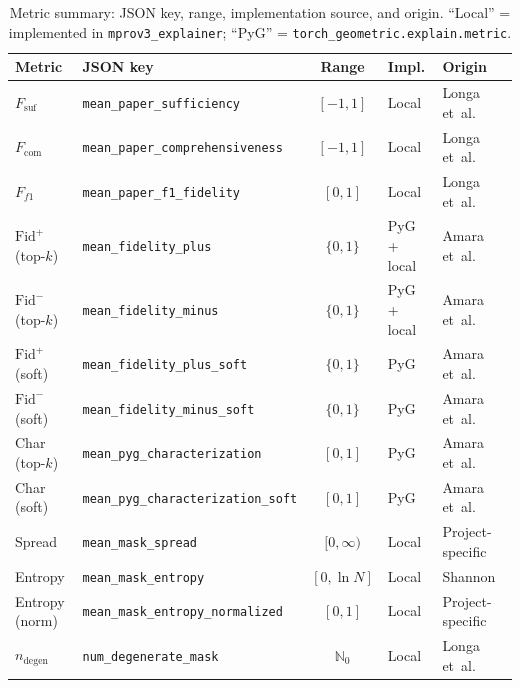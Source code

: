 \documentclass[11pt,a4paper]{article}
\newcommand{\jsonkey}[1]{\texttt{#1}}
\begin{document}
\begin{table}[ht]
\centering
\footnotesize
\begin{tabular}{@{}llcll@{}}
\toprule
\textbf{Metric} & \textbf{JSON key} & \textbf{Range} &
  \textbf{Impl.} & \textbf{Origin} \\
\midrule
$F_{\mathrm{suf}}$
  & \jsonkey{mean\_paper\_sufficiency}
  & $[-1,1]$
  & Local
  & Longa et~al.~\cite{longa2025} \\
$F_{\mathrm{com}}$
  & \jsonkey{mean\_paper\_comprehensiveness}
  & $[-1,1]$
  & Local
  & Longa et~al.~\cite{longa2025} \\
$F_{f1}$
  & \jsonkey{mean\_paper\_f1\_fidelity}
  & $[0,1]$
  & Local
  & Longa et~al.~\cite{longa2025} \\
\midrule
$\mathrm{Fid}^+$ (top-$k$)
  & \jsonkey{mean\_fidelity\_plus}
  & $\{0,1\}$
  & PyG + local
  & Amara et~al.~\cite{amara2022graphframex} \\
$\mathrm{Fid}^-$ (top-$k$)
  & \jsonkey{mean\_fidelity\_minus}
  & $\{0,1\}$
  & PyG + local
  & Amara et~al.~\cite{amara2022graphframex} \\
$\mathrm{Fid}^+$ (soft)
  & \jsonkey{mean\_fidelity\_plus\_soft}
  & $\{0,1\}$
  & PyG
  & Amara et~al.~\cite{amara2022graphframex} \\
$\mathrm{Fid}^-$ (soft)
  & \jsonkey{mean\_fidelity\_minus\_soft}
  & $\{0,1\}$
  & PyG
  & Amara et~al.~\cite{amara2022graphframex} \\
Char (top-$k$)
  & \jsonkey{mean\_pyg\_characterization}
  & $[0,1]$
  & PyG
  & Amara et~al.~\cite{amara2022graphframex} \\
Char (soft)
  & \jsonkey{mean\_pyg\_characterization\_soft}
  & $[0,1]$
  & PyG
  & Amara et~al.~\cite{amara2022graphframex} \\
\midrule
Spread
  & \jsonkey{mean\_mask\_spread}
  & $[0,\infty)$
  & Local
  & Project-specific \\
Entropy
  & \jsonkey{mean\_mask\_entropy}
  & $[0,\ln N]$
  & Local
  & Shannon~\cite{shannon1948} \\
Entropy (norm)
  & \jsonkey{mean\_mask\_entropy\_normalized}
  & $[0,1]$
  & Local
  & Project-specific \\
$n_{\mathrm{degen}}$
  & \jsonkey{num\_degenerate\_mask}
  & $\mathbb{N}_0$
  & Local
  & Longa et~al.~\cite{longa2025} \\
\bottomrule
\end{tabular}
\caption{Metric summary: JSON key, range, implementation source, and origin.
``Local'' = implemented in \texttt{mprov3\_explainer};
``PyG'' = \texttt{torch\_geometric.explain.metric}.}
\label{tab:summary}
\end{table}
\end{document}
